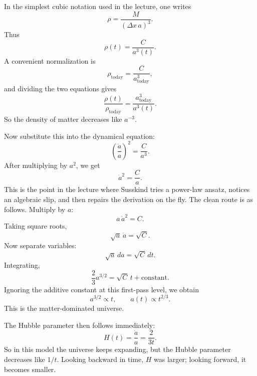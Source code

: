 In the simplest cubic notation used in the lecture, one writes
\begin{equation}
\rho=\frac{M}{(\Delta x\,a)^3}.
\end{equation}
Thus
\begin{equation}
\rho(t)=\frac{C}{a^3(t)}.
\end{equation}
A convenient normalization is
\begin{equation}
\rho_{\text{today}}=\frac{C}{a_{\text{today}}^3},
\end{equation}
and dividing the two equations gives
\begin{equation}
\frac{\rho(t)}{\rho_{\text{today}}}
=
\frac{a_{\text{today}}^3}{a^3(t)}.
\end{equation}
So the density of matter decreases like \(a^{-3}\).

Now substitute this into the dynamical equation:
\begin{equation}
\left(\frac{\dot a}{a}\right)^2=\frac{C}{a^3}.
\end{equation}
After multiplying by \(a^2\), we get
\begin{equation}
\dot a^2=\frac{C}{a}.
\end{equation}
This is the point in the lecture where Susskind tries a power-law ansatz, notices an algebraic slip, and then repairs the derivation on the fly. The clean route is as follows. Multiply by \(a\):
\begin{equation}
a\,\dot a^2 = C.
\end{equation}
Taking square roots,
\begin{equation}
\sqrt{a}\,\dot a = \sqrt{C}.
\end{equation}
Now separate variables:
\begin{equation}
\sqrt{a}\,da = \sqrt{C}\,dt.
\end{equation}
Integrating,
\begin{equation}
\frac{2}{3}a^{3/2} = \sqrt{C}\,t + \text{constant}.
\end{equation}
Ignoring the additive constant at this first-pass level, we obtain
\begin{equation}
a^{3/2}\propto t,
\qquad
a(t)\propto t^{2/3}.
\end{equation}
This is the matter-dominated universe.

The Hubble parameter then follows immediately:
\begin{equation}
H(t)=\frac{\dot a}{a}=\frac{2}{3t}.
\end{equation}
So in this model the universe keeps expanding, but the Hubble parameter decreases like \(1/t\). Looking backward in time, \(H\) was larger; looking forward, it becomes smaller.

